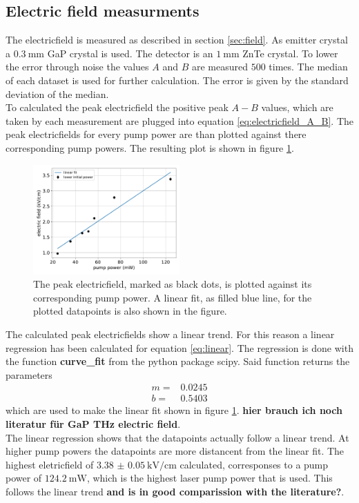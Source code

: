 \subsection{Electric field measurments}
\FloatBarrier
The electricfield is measured as described in section \ref{sec:field}.
As emitter crystal a $\SI{0.3}{\milli\meter}$ GaP crystal is used.
The detector is an $\SI{1}{\milli\meter}$ ZnTe crystal.
To lower the error through noise the values $A$ and $B$ are measured $500$ times.
The median of each dataset is used for further calculation.
The error is given by the standard deviation of the median.
\\
To calculated the peak electricfield the positive peak $A-B$ values, which are taken by each measurement are plugged into equation \ref{eq:electricfield_A_B}.
The peak electricfields for every pump power are than plotted against there corresponding pump powers.
The resulting plot is shown in figure \ref{fig:gap_electricfield}.
\begin{figure}
    \centering
    \includegraphics[width=0.5\textwidth]{Plots/eltric_field_GaP.pdf}
    \caption{The peak electricfield, marked as black dots, is plotted against its corresponding pump power.
    A linear fit, as filled blue line, for the plotted datapoints is also shown in the figure.}
    \label{fig:gap_electricfield}
\end{figure}
The calculated peak electricfields show a linear trend.
For this reason a linear regression has been calculated for equation \ref{eq:linear}.
The regression is done with the function \textbf{curve\_fit} from the python package scipy.
Said function returns the parameters
\begin{align*} 
    m =& 0.0245\\
    b =& 0.5403
\end{align*}
which are used to make the linear fit shown in figure \ref{fig:gap_electricfield}.
\textbf{hier brauch ich noch literatur für GaP THz electric field}.
\\
The linear regression shows that the datapoints actually follow a linear trend.
At higher pump powers the datapoints are more distancent from the linear fit.
The highest eletricfield of $\SI{3.38(5)}{\kilo\V\per\centi\meter}$ calculated, corresponses to a pump power of $\SI{124.2}{\milli\W}$, which is the highest laser pump power that is used.
This follows the linear trend \textbf{and is in good comparission with the literature?}.

